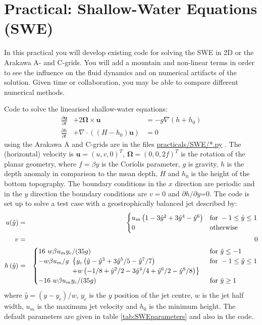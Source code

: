 \clearpage{}


\section{Practical: Shallow-Water Equations (SWE)}

In this practical you will develop existing code for solving the SWE
in 2D or the Arakawa A- and C-grids. You will add a mountain and non-linear
terms in order to see the influence on the fluid dynamics and on numerical
artifacts of the solution. Given time or collaboration, you may be
able to compare different numerical methods.

Code to solve the linearised shallow-water equations:
\begin{eqnarray}
\frac{\partial\mathbf{u}}{\partial t} & +2\bm{\Omega}\times\mathbf{u} & =-g\nabla\left(h+h_{0}\right)\\
\frac{\partial h}{\partial t} & +\nabla\cdot\left(\left(H-h_{0}\right)\mathbf{u}\right) & =0
\end{eqnarray}
using the Arakawa A and C-grids are in the files \url{practicals/SWE/*.py}
. The (horizontal) velocity is $\mathbf{u}=(u,v,0)^{T}$, $\bm{\Omega}=(0,0,2f)^{T}$
is the rotation of the planar geometry, where $f=\beta y$ is the
Coriolis parameter, $g$ is gravity, $h$ is the depth anomaly in
comparison to the mean depth, $H$ and $h_{0}$ is the height of the
bottom topography. The boundary conditions in the $x$ direction are
periodic and in the $y$ direction the boundary conditions are $v=0$
and $\partial h/\partial y$=0. The code is set up to solve a test
case with a geostrophically balanced jet described by: 
\begin{eqnarray*}
u(\hat{y}) & = & \begin{cases}
u_{m}\left(1-3\hat{y}^{2}+3\hat{y}^{4}-\hat{y}^{6}\right) & \text{for }-1\le\hat{y}\le1\\
0 & \text{otherwise}
\end{cases}\\
v & = & 0\\
h\left(\hat{y}\right) & = & \begin{cases}
16\ w\beta u_{m}y_{c}/(35g) & \textnormal{for }\hat{y}\le-1\\
-w\beta u_{m}/g\begin{array}[t]{l}
\bigl\{ y_{c}\left(\hat{y}-\hat{y}^{3}+3\hat{y}^{5}/5-\hat{y}^{7}/7\right)\\
+w\left(-1/8+\hat{y}^{2}/2-3\hat{y}^{4}/4+\hat{y}^{6}/2-\hat{y}^{8}/8\right)\bigr\}
\end{array} & \textnormal{for }-1\le\hat{y}\le1\\
-16\ w\beta u_{m}y_{c}/(35g) & \textnormal{for }\hat{y}\ge1
\end{cases}
\end{eqnarray*}
where $\hat{y}=(y-y_{c})/w$, $y_{c}$ is the $y$ position of the
jet centre, $w$ is the jet half width, $u_{m}$ is the maximum jet
velocity and $h_{0}$ is the minimum height. The default parameters
are given in table \ref{tab:SWEparameters} and also in the code.

